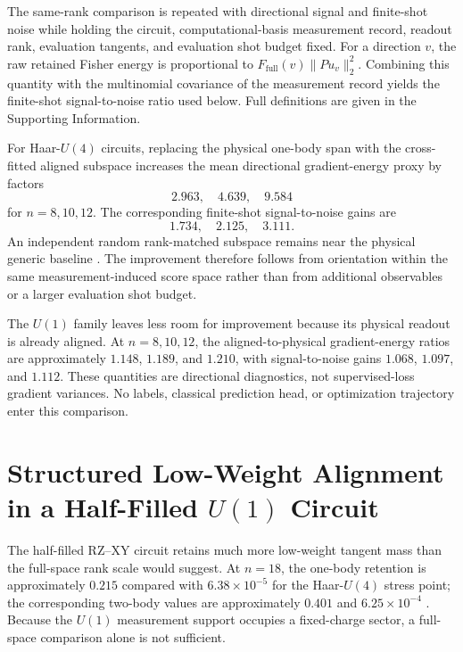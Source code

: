 The same-rank comparison is repeated with directional signal and finite-shot noise while holding the circuit, computational-basis measurement record, readout rank, evaluation tangents, and evaluation shot budget fixed. For a direction $v$, the raw retained Fisher energy is proportional to $F_{\mathrm{full}}(v)\|Pu_v\|_2^2$. Combining this quantity with the multinomial covariance of the measurement record yields the finite-shot signal-to-noise ratio used below. Full definitions are given in the Supporting Information.

For Haar-$U(4)$ circuits, replacing the physical one-body span with the cross-fitted aligned subspace increases the mean directional gradient-energy proxy by factors
\begin{equation}
 2.963,\quad 4.639,\quad 9.584
\end{equation}
for $n=8,10,12$. The corresponding finite-shot signal-to-noise gains are
\begin{equation}
 1.734,\quad 2.125,\quad 3.111.
\end{equation}
An independent random rank-matched subspace remains near the physical generic baseline \cite{AitHaddou2026MeasurementAccessible}. The improvement therefore follows from orientation within the same measurement-induced score space rather than from additional observables or a larger evaluation shot budget.

The $U(1)$ family leaves less room for improvement because its physical readout is already aligned. At $n=8,10,12$, the aligned-to-physical gradient-energy ratios are approximately $1.148$, $1.189$, and $1.210$, with signal-to-noise gains $1.068$, $1.097$, and $1.112$. These quantities are directional diagnostics, not supervised-loss gradient variances. No labels, classical prediction head, or optimization trajectory enter this comparison.

\section{Structured Low-Weight Alignment in a Half-Filled $U(1)$ Circuit}

The half-filled RZ--XY circuit retains much more low-weight tangent mass than the full-space rank scale would suggest. At $n=18$, the one-body retention is approximately $0.215$ compared with $6.38\times10^{-5}$ for the Haar-$U(4)$ stress point; the corresponding two-body values are approximately $0.401$ and $6.25\times10^{-4}$ \cite{AitHaddou2026MeasurementAccessible}. Because the $U(1)$ measurement support occupies a fixed-charge sector, a full-space comparison alone is not sufficient.

